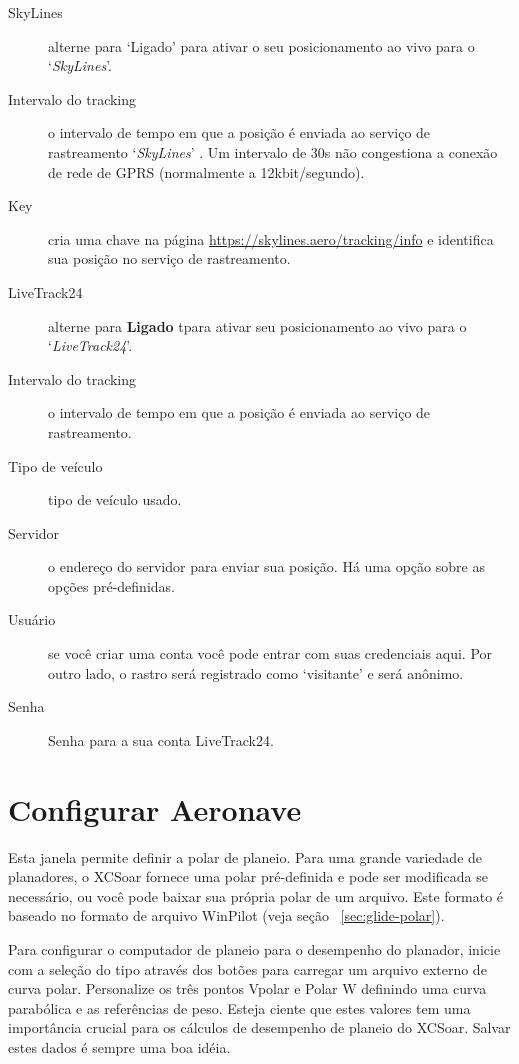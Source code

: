 \begin{description}
\item[SkyLines]  alterne para ‘Ligado’ para ativar o seu posicionamento ao vivo para o `{\em SkyLines}'.
\item[Intervalo do tracking]  o intervalo de tempo em que a posição é enviada ao serviço de rastreamento  `{\em SkyLines}' .  Um intervalo de 30s não congestiona a conexão de rede de GPRS (normalmente a 12kbit/segundo).
\item[Key]  cria uma chave na página  \url{https://skylines.aero/tracking/info} 
   e identifica sua posição no serviço de rastreamento.
\\
\item[LiveTrack24]  alterne para  {\bf Ligado} tpara ativar seu posicionamento ao vivo para o `{\em LiveTrack24}'.
\item[Intervalo do tracking]  o intervalo de tempo em que a posição é enviada ao serviço de rastreamento.
\item[Tipo de veículo] tipo de veículo usado.
\item[Servidor]  o endereço do servidor para enviar sua posição.  Há uma opção sobre as opções pré-definidas.
\item[Usuário]  se você criar uma conta você pode entrar com suas credenciais aqui.  Por outro lado, o rastro será registrado como ‘visitante’ e será anônimo.
\item[Senha]  Senha para a sua conta LiveTrack24.
\end{description}


\section{Configurar Aeronave}

Esta janela permite definir a polar de planeio.  Para uma grande variedade 
de planadores, o XCSoar fornece uma polar pré-definida e pode ser modificada se necessário, ou você pode baixar sua própria polar de um arquivo.  Este formato é baseado no formato de arquivo WinPilot (veja seção ~\ref{sec:glide-polar}).

\label{conf:polar} Para configurar o computador de planeio para o desempenho do planador, inicie com a seleção do tipo através dos botões     para carregar um arquivo externo de curva polar.
Personalize os três pontos Vpolar e Polar W definindo uma curva parabólica e as referências de peso.  Esteja ciente que estes valores tem uma importância crucial para os cálculos de desempenho de planeio do XCSoar.  \tip Salvar estes dados é sempre uma boa idéia.

